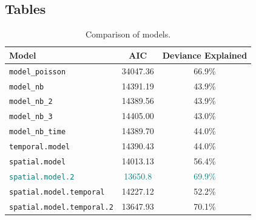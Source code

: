 \subsection{Tables}

\begin{table}[H]
\centering
\begin{tabular}{l|c|c}
Model & AIC & Deviance Explained\\\hline
\texttt{model\_poisson} & 34047.36 & 66.9\%\\
\texttt{model\_nb} & 14391.19 & 43.9\%\\
\texttt{model\_nb\_2} & 14389.56 & 43.9\%\\
\texttt{model\_nb\_3} & 14405.00 & 43.0\%\\
\texttt{model\_nb\_time} & 14389.70 & 44.0\%\\
\texttt{temporal.model} & 14390.43 & 44.0\%\\
\texttt{spatial.model} & 14013.13 & 56.4\%\\
\textcolor{teal}{\texttt{spatial.model.2}} & \textcolor{teal}{13650.8} & \textcolor{teal}{69.9\%}\\
\texttt{spatial.model.temporal} & 14227.12 & 52.2\%\\
\texttt{spatial.model.temporal.2} & 13647.93 & 70.1\%
\end{tabular}
\caption{\label{tab:metrics}Comparison of models.}
\end{table}

